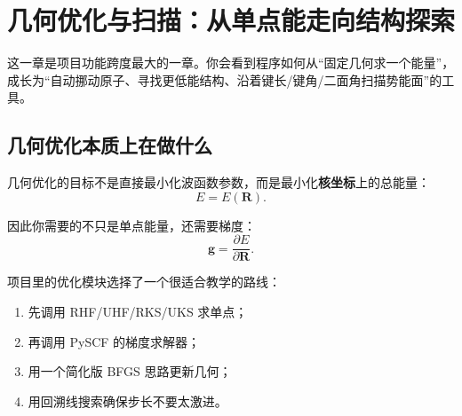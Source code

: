 \documentclass[UTF8,11pt,fontset=fandol]{ctexbook}
\begin{document}
\chapter{几何优化与扫描：从单点能走向结构探索}

\begin{goalbox}[本章目标]
这一章是项目功能跨度最大的一章。你会看到程序如何从“固定几何求一个能量”，成长为“自动挪动原子、寻找更低能结构、沿着键长/键角/二面角扫描势能面”的工具。
\end{goalbox}

\section{几何优化本质上在做什么}

几何优化的目标不是直接最小化波函数参数，而是最小化\textbf{核坐标}上的总能量：
\begin{equation}
E = E(\mathbf{R}).
\end{equation}

因此你需要的不只是单点能量，还需要梯度：
\begin{equation}
\mathbf{g} = \frac{\partial E}{\partial \mathbf{R}}.
\end{equation}

项目里的优化模块选择了一个很适合教学的路线：
\begin{enumerate}[label=\arabic*.]
  \item 先调用 RHF/UHF/RKS/UKS 求单点；
  \item 再调用 PySCF 的梯度求解器；
  \item 用一个简化版 BFGS 思路更新几何；
  \item 用回溯线搜索确保步长不要太激进。
\end{enumerate}
\end{document}
